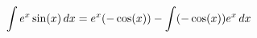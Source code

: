 \documentclass[preview]{standalone}
\begin{document}
\begin{align*}
\special{dvisvgm:raw <g id='unique000'>}\int e^x \sin(x) \, dx = e^x(-\cos(x)) - \int (-\cos(x)) e^x \, dx\special{dvisvgm:raw </g>}
\end{align*}
\end{document}
